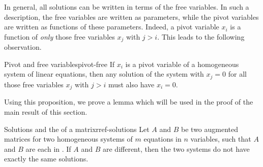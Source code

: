 In general, all solutions can be written in terms of the free
variables. In such a description, the free variables are written as
parameters, while the pivot variables are written as functions of
these parameters. Indeed, a pivot variable $x_i$ is a function of {\em
  only} those free variables $x_j$ with $j>i$. This leads to the
following observation.

\begin{proposition}{Pivot and free variables}{pivot-free}
  If $x_i$ is a pivot variable of a homogeneous system of linear
  equations, then any solution of the system with $x_j=0$ for all
  those free variables $x_j$ with $j>i$ must also have $x_i=0$.
\end{proposition}

Using this proposition, we prove a lemma which will be used in the
proof of the main result of this section.

\begin{lemma}{Solutions and the {\rref} of a matrix}{rref-solutions}
  Let $A$ and $B$ be two augmented matrices for two homogeneous
  systems of $m$ equations in $n$ variables, such that $A$ and $B$ are
  each in {\rref}. If $A$ and $B$ are different, then the two systems
  do not have exactly the same solutions.
\end{lemma}

